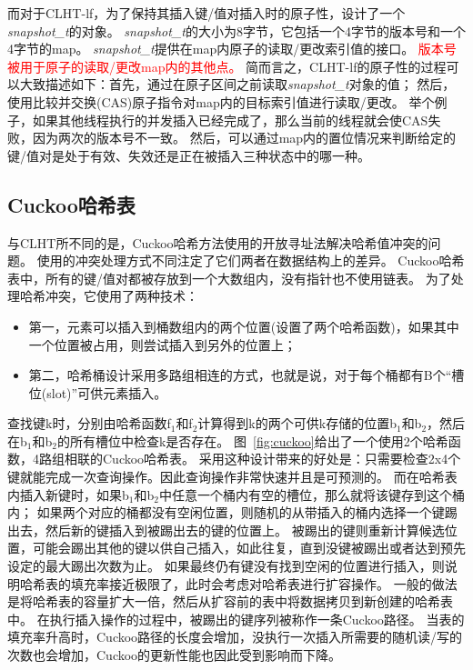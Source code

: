 而对于CLHT-lf，为了保持其插入键/值对插入时的原子性，设计了一个\textit{snapshot\_t}的对象。
\textit{snapshot\_t}的大小为8字节，它包括一个4字节的版本号和一个4字节的map。
\textit{snapshot\_t}提供在map内原子的读取/更改索引值的接口。
\textcolor{red}{版本号被用于原子的读取/更改map内的其他点。}
简而言之，CLHT-lf的原子性的过程可以大致描述如下：首先，通过在原子区间之前读取\textit{snapshot\_t}对象的值；
然后，使用比较并交换(CAS)原子指令对map内的目标索引值进行读取/更改。
举个例子，如果其他线程执行的并发插入已经完成了，那么当前的线程就会使CAS失败，因为两次的版本号不一致。
然后，可以通过map内的置位情况来判断给定的键/值对是处于有效、失效还是正在被插入三种状态中的哪一种。

\subsection{Cuckoo哈希表}
与CLHT所不同的是，Cuckoo哈希方法使用的开放寻址法解决哈希值冲突的问题。
使用的冲突处理方式不同注定了它们两者在数据结构上的差异。
Cuckoo哈希表中，所有的键/值对都被存放到一个大数组内，没有指针也不使用链表。
为了处理哈希冲突，它使用了两种技术：
\begin{itemize}
\item 第一，元素可以插入到桶数组内的两个位置(设置了两个哈希函数)，如果其中一个位置被占用，则尝试插入到另外的位置上；
\item 第二，哈希桶设计采用多路组相连的方式，也就是说，对于每个桶都有B个“槽位(slot)”可供元素插入。
\end{itemize}

查找键k时，分别由哈希函数f$_1$和f$_2$计算得到k的两个可供k存储的位置b$_1$和b$_2$，然后在b$_1$和b$_2$的所有槽位中检查k是否存在。
图~\ref{fig:cuckoo}给出了一个使用2个哈希函数，4路组相联的Cuckoo哈希表。
采用这种设计带来的好处是：只需要检查2x4个键就能完成一次查询操作。因此查询操作非常快速并且是可预测的。
而在哈希表内插入新键时，如果b$_1$和b$_2$中任意一个桶内有空的槽位，那么就将该键存到这个桶内；
如果两个对应的桶都没有空闲位置，则随机的从带插入的桶内选择一个键踢出去，然后新的键插入到被踢出去的键的位置上。
被踢出的键则重新计算候选位置，可能会踢出其他的键以供自己插入，如此往复，直到没键被踢出或者达到预先设定的最大踢出次数为止。
如果最终仍有键没有找到空闲的位置进行插入，则说明哈希表的填充率接近极限了，此时会考虑对哈希表进行扩容操作。
一般的做法是将哈希表的容量扩大一倍，然后从扩容前的表中将数据拷贝到新创建的哈希表中。
在执行插入操作的过程中，被踢出的键序列被称作一条Cuckoo路径。
当表的填充率升高时，Cuckoo路径的长度会增加，没执行一次插入所需要的随机读/写的次数也会增加，Cuckoo的更新性能也因此受到影响而下降。


